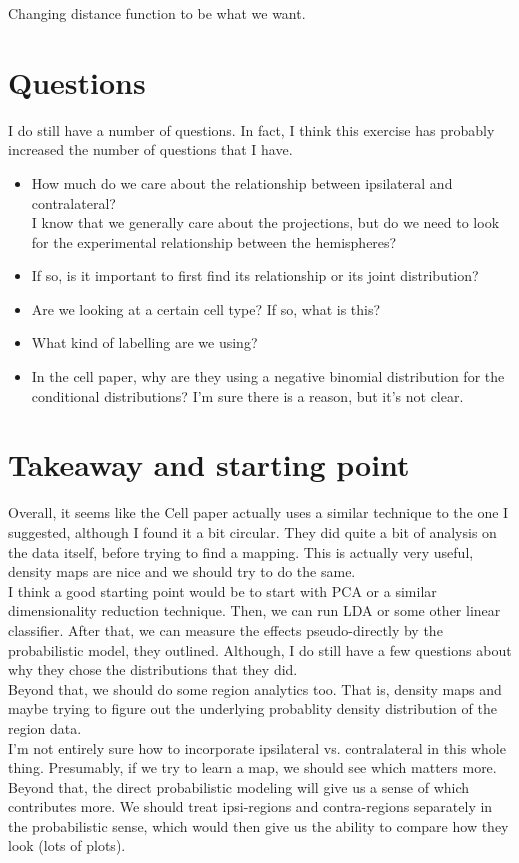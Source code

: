 \documentclass[10.5pt]{article}
\begin{document}
Changing distance function to be what we want. 
\section{Questions}
I do still have a number of questions. In fact, I think this exercise has probably increased the number of questions that I have. \\

\begin{itemize}
  \item How much do we care about the relationship between ipsilateral and contralateral?\\

  I know that we generally care about the projections, but do we need to look for the experimental relationship between the hemispheres? 
  \item If so, is it important to first find its relationship or its joint distribution?  
  \item Are we looking at a certain cell type? If so, what is this? 
  \item What kind of labelling are we using? 
  \item In the cell paper, why are they using a negative binomial distribution for the conditional distributions? I'm sure there is a reason, but it's not clear. 
\end{itemize}


\section{Takeaway and starting point}

Overall, it seems like the Cell paper actually uses a similar technique to the one I suggested, although I found it a bit circular. They did quite a bit of analysis on the data itself, before trying to find a mapping. This is actually very useful, density maps are nice and we should try to do the same. \\

I think a good starting point would be to start with PCA or a similar dimensionality reduction technique. Then, we can run LDA or some other linear classifier. After that, we can measure the effects pseudo-directly by the probabilistic model, they outlined. Although, I do still have a few questions about why they chose the distributions that they did. \\

Beyond that, we should do some region analytics too. That is, density maps and maybe trying to figure out the underlying probablity density distribution of the region data. \\

I'm not entirely sure how to incorporate ipsilateral vs. contralateral in this whole thing. Presumably, if we try to learn a map, we should see which matters more. Beyond that, the direct probabilistic modeling will give us a sense of which contributes more. We should treat ipsi-regions and contra-regions separately in the probabilistic sense, which would then give us the ability to compare how they look (lots of plots). 
\end{document}
